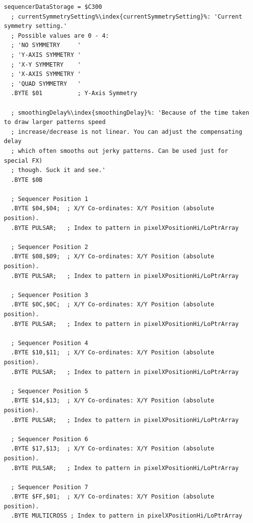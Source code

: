 \begin{lstlisting}[basicstyle=\ttfamily\scriptsize,caption=Sequencer definition in \icode{sequencer\_data.asm}.,escapechar=\%]
sequencerDataStorage = $C300
  ; currentSymmetrySetting%\index{currentSymmetrySetting}%: 'Current symmetry setting.'                     
  ; Possible values are 0 - 4:                                              
  ; 'NO SYMMETRY     '                                                      
  ; 'Y-AXIS SYMMETRY '                                                      
  ; 'X-Y SYMMETRY    '                                                      
  ; 'X-AXIS SYMMETRY '                                                      
  ; 'QUAD SYMMETRY   '                                                      
  .BYTE $01          ; Y-Axis Symmetry

  ; smoothingDelay%\index{smoothingDelay}%: 'Because of the time taken to draw larger patterns speed
  ; increase/decrease is not linear. You can adjust the compensating delay
  ; which often smooths out jerky patterns. Can be used just for special FX)
  ; though. Suck it and see.'                                               
  .BYTE $0B

  ; Sequencer Position 1
  .BYTE $04,$04;  ; X/Y Co-ordinates: X/Y Position (absolute position).   
  .BYTE PULSAR;   ; Index to pattern in pixelXPositionHi/LoPtrArray   

  ; Sequencer Position 2
  .BYTE $08,$09;  ; X/Y Co-ordinates: X/Y Position (absolute position).   
  .BYTE PULSAR;   ; Index to pattern in pixelXPositionHi/LoPtrArray   

  ; Sequencer Position 3
  .BYTE $0C,$0C;  ; X/Y Co-ordinates: X/Y Position (absolute position).   
  .BYTE PULSAR;   ; Index to pattern in pixelXPositionHi/LoPtrArray   

  ; Sequencer Position 4
  .BYTE $10,$11;  ; X/Y Co-ordinates: X/Y Position (absolute position).   
  .BYTE PULSAR;   ; Index to pattern in pixelXPositionHi/LoPtrArray   

  ; Sequencer Position 5
  .BYTE $14,$13;  ; X/Y Co-ordinates: X/Y Position (absolute position).   
  .BYTE PULSAR;   ; Index to pattern in pixelXPositionHi/LoPtrArray   

  ; Sequencer Position 6
  .BYTE $17,$13;  ; X/Y Co-ordinates: X/Y Position (absolute position).   
  .BYTE PULSAR;   ; Index to pattern in pixelXPositionHi/LoPtrArray   

  ; Sequencer Position 7
  .BYTE $FF,$01;  ; X/Y Co-ordinates: X/Y Position (absolute position).   
  .BYTE MULTICROSS ; Index to pattern in pixelXPositionHi/LoPtrArray   


\end{lstlisting}
